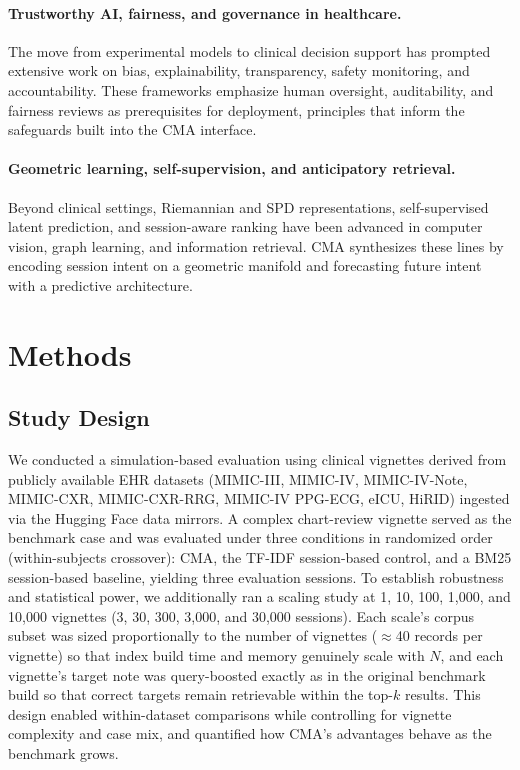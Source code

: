 \documentclass[preprint,12pt]{elsarticle}
\begin{document}
\paragraph{Trustworthy AI, fairness, and governance in healthcare.}
The move from experimental models to clinical decision support has prompted extensive work on bias, explainability, transparency, safety monitoring, and accountability. \citep{limaye20,association25,ordez26,haick26,nouis25} These frameworks emphasize human oversight, auditability, and fairness reviews as prerequisites for deployment, principles that inform the safeguards built into the CMA interface.

\paragraph{Geometric learning, self-supervision, and anticipatory retrieval.}
Beyond clinical settings, Riemannian and SPD representations, self-supervised latent prediction, and session-aware ranking have been advanced in computer vision, graph learning, and information retrieval. \citep{oord18,hong25,papachappa26,bakas26,al20,cma2026a} CMA synthesizes these lines by encoding session intent on a geometric manifold and forecasting future intent with a predictive architecture.

\section{Methods}

\subsection{Study Design}
We conducted a simulation-based evaluation using clinical vignettes derived from publicly available EHR datasets (MIMIC-III, MIMIC-IV, MIMIC-IV-Note, MIMIC-CXR, MIMIC-CXR-RRG, MIMIC-IV PPG-ECG, eICU, HiRID) ingested via the Hugging Face data mirrors. A complex chart-review vignette served as the benchmark case and was evaluated under three conditions in randomized order (within-subjects crossover): CMA, the TF-IDF session-based control, and a BM25 session-based baseline, yielding three evaluation sessions. To establish robustness and statistical power, we additionally ran a scaling study at 1, 10, 100, 1{,}000, and 10{,}000 vignettes (3, 30, 300, 3{,}000, and 30{,}000 sessions). Each scale's corpus subset was sized proportionally to the number of vignettes ($\approx$40 records per vignette) so that index build time and memory genuinely scale with $N$, and each vignette's target note was query-boosted exactly as in the original benchmark build so that correct targets remain retrievable within the top-$k$ results. This design enabled within-dataset comparisons while controlling for vignette complexity and case mix, and quantified how CMA's advantages behave as the benchmark grows.
\end{document}
